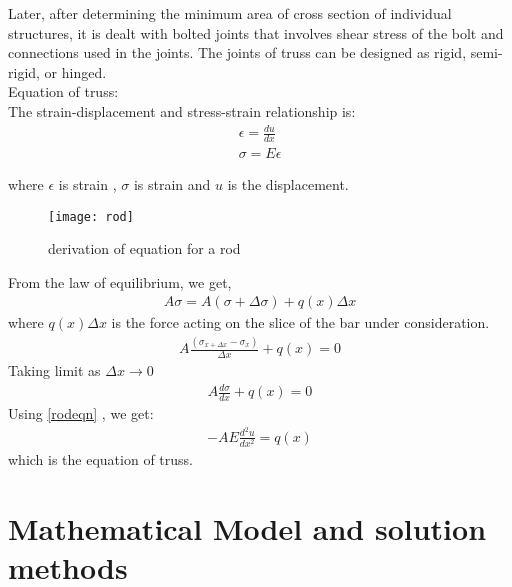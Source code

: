 Later, after determining the minimum area of cross section of individual structures, it is dealt with bolted joints that involves shear stress of the bolt and connections used in the joints. The joints of truss can be designed as rigid, semi-rigid, or hinged.\\

Equation of truss: \\

The strain-displacement and stress-strain relationship  is: \\
\begin{eqnarray}\label{rodeqn}
	\epsilon = \frac{du}{dx}\\
	\sigma = E\epsilon
\end{eqnarray}

where $ \epsilon $ is strain , $\sigma$ is strain and $u$ is the displacement.

    \begin{figure}[h!]
	\centering
	\texttt{[image: rod]}
	\caption{derivation of equation for a rod}
\end{figure}
From the law of equilibrium, we get, 
\begin{eqnarray}
	A\sigma = A(\sigma + \Delta \sigma) + q(x) \Delta x 
\end{eqnarray}
where $q(x) \Delta x$ is the force acting on the slice of the bar under consideration.
\begin{eqnarray}
 A \frac{(\sigma_{x + \Delta x} - \sigma_x)}{\Delta x} + q(x)  = 0
\end{eqnarray}
Taking limit as $\Delta x \to 0 $ 
\begin{eqnarray}
A \frac{d\sigma}{dx} + q(x)  = 0
\end{eqnarray}
Using \ref{rodeqn} , we get:
\begin{eqnarray}
	- AE \frac{d^2u}{dx^2} = q(x)
\end{eqnarray}
which is the equation of truss.

\pagebreak
\section{\bf{Mathematical Model and solution methods}}



